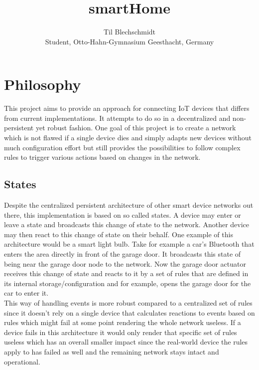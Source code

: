 \documentclass[a4paper]{article}
\title{}
\author{}
\title{smartHome}
\author{Til Blechschmidt\\ Student, Otto-Hahn-Gymnasium Geesthacht, Germany}
\begin{document}
	\maketitle
	\newpage
	
	\tableofcontents
	\listoffigures
	\listoftables
	\newpage
	
	

    \section{Philosophy}
        This project aims to provide an approach for connecting IoT devices that differs from current implementations.
        It attempts to do so in a decentralized and non-persistent yet robust fashion. One goal of this project is to
        create a network which is not flawed if a single device dies and simply adapts new devices without much
        configuration effort but still provides the possibilities to follow complex rules to trigger various actions
        based on changes in the network.
        \subsection{States}
	        Despite the centralized persistent architecture of other smart device networks out there, this
	        implementation is based on so called states. A device may enter or leave a state and broadcasts this change
	        of state to the network. Another device may then react to this change of state on their behalf. One example
	        of this architecture would be a smart light bulb. Take for example a car's Bluetooth that enters the area
	        directly in front of the garage door. It broadcasts this state of being near the garage door node to the
	        network. Now the garage door actuator receives this change of state and reacts to it by a set of rules that
	        are defined in its internal storage/configuration and for example, opens the garage door for the car
	        to enter it.\\
	        This way of handling events is more robust compared to a centralized set of rules since it doesn't rely on a
	        single device that calculates reactions to events based on rules which might fail at some point rendering
	        the whole network useless. If a device fails in this architecture it would only render that specific set of
	        rules useless which has an overall smaller impact since the real-world device the rules apply to has failed
	        as well and the remaining network stays intact and operational.
\end{document}

